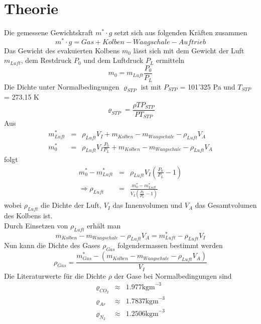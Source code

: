 \documentclass[12pt,a4paper]{article}
\begin{document}
\section*{Theorie}
Die gemessene Gewichtskraft $m^* \cdot g$ setzt sich aus folgenden Kr\"aften zusammen 
\begin{equation}
m^* \cdot g = Gas + Kolben - Waagschale - Auftrieb
\end{equation}
Das Gewicht des evakuierten Kolbens $m_0$ l\"asst sich mit dem Gewicht der Luft $m_{Luft}$, dem Restdruck $P_0$ und dem Luftdruck $P_L$ ermitteln
\begin{equation}
m_0 = m_{Luft} \frac{P_0}{P_L}
\end{equation}
Die Dichte unter Normalbedingungen $\varrho_{STP}$ ist mit $P_{STP}$ = 101'325 Pa und $T_{STP}$ = 273.15 K
\begin{equation}\label{eq:stp}
\varrho_{STP} = \frac{\rho T P_{STP}}{P T_{STP}}
\end{equation}
Aus
\begin{eqnarray}
m^*_{Luft} & = & \rho _{Luft} V_I + m_{Kolben} - m_{Waagschale} - \rho_{Luft} V_A \\
m^*_0 & = & \rho_{Luft} V_I \frac{P_0}{P_L} + m_{Kolben} - m_{Waagschale} - \rho_{Luft} V_A 
\end{eqnarray}
folgt
\begin{eqnarray}
m^*_0 - m^*_{Luft} & = & \rho_{Luft}V_I \left( \frac{P_0}{P_L}-1\right) \\
\Rightarrow \rho_{Luft} & = & \frac{m^*_0 - m^*_{Luft}}{V_I \left( \frac{P_0}{P_L}-1\right)}  \label{eq:rl}
\end{eqnarray}
wobei $\rho_{Luft}$ die Dichte der Luft, $V_I$ das Innenvolumen und $V_A$ das Gesamtvolumen des Kolbens ist. \\
Durch Einsetzen von $\rho_{Luft}$ erh\"alt man
\begin{equation}\label{eq:const}
m_{Kolben} - m_{Waagschale} - \rho_{Luft} V_A = m^*_{Luft} - \rho _{Luft} V_I
\end{equation}
Nun kann die Dichte des Gases $\rho_{Gas}$ folgendermassen bestimmt werden
\begin{equation}\label{eq:rg}
\rho _{Gas} = \frac{m^*_{Gas} - (m_{Kolben} - m_{Waagschale} - \rho_{Luft} V_A)}{V_I}
\end{equation}
Die Literaturwerte f\"ur die Dichte $\rho$ der Gase bei Normalbedingungen sind
\begin{eqnarray}
\varrho_{CO_2} & \approx & 1.977 \mbox{kgm}^{-3}\\
\varrho_{Ar} & \approx & 1.7837  \mbox{kgm}^{-3}\\
\varrho_{N_2} & \approx & 1.2506  \mbox{kgm}^{-3}
\end{eqnarray}
\end{document}
